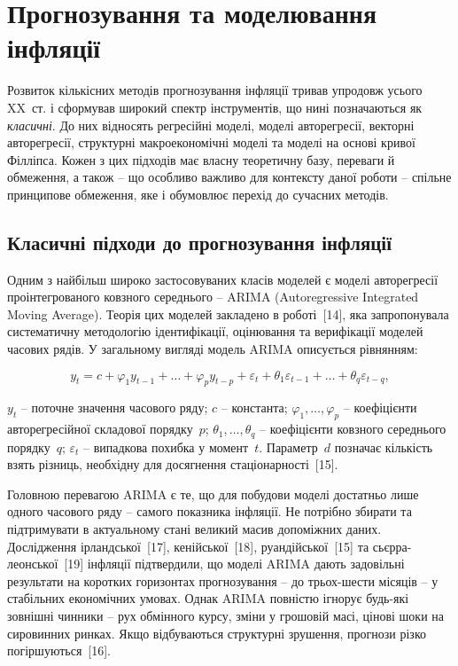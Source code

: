 \documentclass{bachelor_thesis}
\begin{document}
\section{Прогнозування та моделювання інфляції}

Розвиток кількісних методів прогнозування інфляції тривав упродовж усього XX~ст. і сформував широкий спектр інструментів, що нині позначаються як \textit{класичні}. До них відносять регресійні моделі, моделі авторегресії, векторні авторегресії, структурні макроекономічні моделі та моделі на основі кривої Філліпса. Кожен з цих підходів має власну теоретичну базу, переваги й обмеження, а також -- що особливо важливо для контексту даної роботи -- спільне принципове обмеження, яке і обумовлює перехід до сучасних методів.

\subsection{Класичні підходи до прогнозування інфляції}

Одним з найбільш широко застосовуваних класів моделей є моделі авторегресії проінтегрованого ковзного середнього -- ARIMA (Autoregressive Integrated Moving Average). Теорія цих моделей закладено в роботі~[14], яка запропонувала систематичну методологію ідентифікації, оцінювання та верифікації моделей часових рядів. У загальному вигляді модель ARIMA описується рівнянням:

\begin{equation*}
y_t = c + \varphi_1 y_{t-1} + \ldots + \varphi_p y_{t-p}
      + \varepsilon_t + \theta_1\varepsilon_{t-1} + \ldots + \theta_q\varepsilon_{t-q},
\end{equation*}

 $y_t$ -- поточне значення часового ряду; $c$ -- константа; $\varphi_1,\ldots,\varphi_p$ -- коефіцієнти авторегресійної складової порядку~$p$; $\theta_1,\ldots,\theta_q$ -- коефіцієнти ковзного середнього порядку~$q$; $\varepsilon_t$ -- випадкова похибка у момент~$t$. Параметр~$d$ позначає кількість взять різниць, необхідну для досягнення стаціонарності~[15].

Головною перевагою ARIMA є те, що для побудови моделі достатньо лише одного часового ряду -- самого показника інфляції. Не потрібно збирати та підтримувати в актуальному стані великий масив допоміжних даних. Дослідження ірландської~[17], кенійської~[18], руандійської~[15] та сьєрра-леонської~[19] інфляції підтвердили, що моделі ARIMA дають задовільні результати на коротких горизонтах прогнозування -- до трьох-шести місяців -- у стабільних економічних умовах. Однак ARIMA повністю ігнорує будь-які зовнішні чинники -- рух обмінного курсу, зміни у грошовій масі, цінові шоки на сировинних ринках. Якщо відбуваються структурні зрушення, прогнози різко погіршуються~[16].
\end{document}
